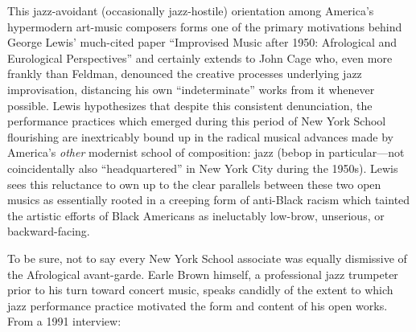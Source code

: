     This jazz-avoidant (occasionally jazz-hostile) orientation among America's hypermodern art-music composers forms one of the primary motivations behind George Lewis' much-cited paper ``Improvised Music after 1950: Afrological and Eurological Perspectives'' and certainly extends to John Cage who, even more frankly than Feldman, denounced the creative processes underlying jazz improvisation, distancing his own ``indeterminate'' works from it whenever possible. Lewis hypothesizes that despite this consistent denunciation, the performance practices which emerged during this period of New York School flourishing are inextricably bound up in the radical musical advances made by America's \textit{other} modernist school of composition: jazz (bebop in particular---not coincidentally also ``headquartered'' in New York City during the 1950s). Lewis sees this reluctance to own up to the clear parallels between these two open musics as essentially rooted in a creeping form of anti-Black racism which tainted the artistic efforts of Black Americans as ineluctably low-brow, unserious, or backward-facing.\autocite{Lewis_2002} 

    To be sure, not to say every New York School associate was equally dismissive of the Afrological avant-garde. Earle Brown himself, a professional jazz trumpeter prior to his turn toward concert music, speaks candidly of the extent to which jazz performance practice motivated the form and content of his open works. From a 1991 interview:

